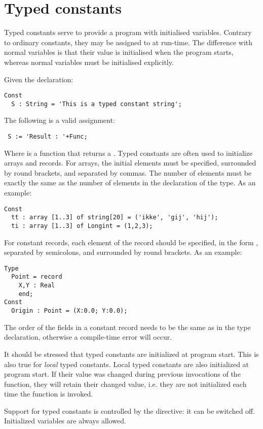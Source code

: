 \section{Typed constants}
Typed constants serve to provide a program with initialised variables.
Contrary to ordinary constants, they may be assigned to at run-time.
The difference with normal variables is that their value is initialised
when the program starts, whereas normal variables must be initialised
explicitly.

Given the declaration:
\begin{verbatim}
Const
  S : String = 'This is a typed constant string';
\end{verbatim}
The following is a valid assignment:
\begin{verbatim}
 S := 'Result : '+Func;
\end{verbatim}
Where  is a function that returns a .
Typed constants are often used to initialize arrays and records. For arrays,
the initial elements must be specified, surrounded by round brackets, and
separated by commas. The number of elements must be exactly the same as
the number of elements in the declaration of the type.
As an example:
\begin{verbatim}
Const
  tt : array [1..3] of string[20] = ('ikke', 'gij', 'hij');
  ti : array [1..3] of Longint = (1,2,3);
\end{verbatim}
For constant records, each element of the record should be specified, in
the form , separated by semicolons, and surrounded by round
brackets.
As an example:
\begin{verbatim}
Type
  Point = record
    X,Y : Real
    end;
Const
  Origin : Point = (X:0.0; Y:0.0);
\end{verbatim}
The order of the fields in a constant record needs to be the same as in the type declaration,
otherwise a compile-time error will occur.

\begin{remark}
It should be stressed that typed constants are initialized at program start.
This is also true for {\em local} typed constants. Local typed constants are
also initialized at program start. If their value was changed during previous
invocations of the function, they will retain their changed value, i.e. they
are not initialized each time the function is invoked.
\end{remark}

\begin{remark}
Support for typed constants is controlled by the  directive: it
can be switched off. Initialized variables are always allowed.
\end{remark}



